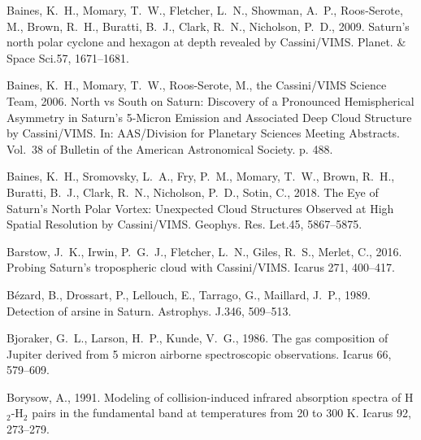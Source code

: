 \documentclass[article,11pt]{emulateapj}
\def\apj{Astrophys. J.}
\def\grl{Geophys. Res. Let.}
\def\planss{Planet. \& Space Sci.}
\begin{document}
\begin{thebibliography}{85}
{Baines}, K.~H., {Momary}, T.~W., {Fletcher}, L.~N., {Showman}, A.~P.,
  {Roos-Serote}, M., {Brown}, R.~H., {Buratti}, B.~J., {Clark}, R.~N.,
  {Nicholson}, P.~D., 2009{}. {Saturn's north polar cyclone and
  hexagon at depth revealed by Cassini/VIMS}. \planss 57, 1671--1681.

{Baines}, K.~H., {Momary}, T.~W., {Roos-Serote}, M., {the Cassini/VIMS Science
  Team}, 2006. {North vs South on Saturn: Discovery of a Pronounced
  Hemispherical Asymmetry in Saturn's 5-Micron Emission and Associated Deep
  Cloud Structure by Cassini/VIMS}. In: AAS/Division for Planetary Sciences
  Meeting Abstracts. Vol.~38 of Bulletin of the American Astronomical Society.
  p. 488.

{Baines}, K.~H., {Sromovsky}, L.~A., {Fry}, P.~M., {Momary}, T.~W., {Brown},
  R.~H., {Buratti}, B.~J., {Clark}, R.~N., {Nicholson}, P.~D., {Sotin}, C.,
  2018. {The Eye of Saturn's North Polar Vortex: Unexpected Cloud Structures
  Observed at High Spatial Resolution by Cassini/VIMS}. \grl 45, 5867--5875.

{Barstow}, J.~K., {Irwin}, P.~G.~J., {Fletcher}, L.~N., {Giles}, R.~S.,
  {Merlet}, C., 2016. {Probing Saturn's tropospheric cloud with Cassini/VIMS}.
  Icarus 271, 400--417.

{B\'ezard}, B., {Drossart}, P., {Lellouch}, E., {Tarrago}, G., {Maillard},
  J.~P., 1989. {Detection of arsine in Saturn}. \apj 346, 509--513.

{Bjoraker}, G.~L., {Larson}, H.~P., {Kunde}, V.~G., 1986. {The gas composition
  of Jupiter derived from 5 micron airborne spectroscopic observations}. Icarus
  66, 579--609.

{Borysow}, A., 1991. {Modeling of collision-induced infrared absorption spectra
  of H$_2$-H$_2$ pairs in the fundamental band at temperatures from 20 to 300
  K}. Icarus 92, 273--279.


\end{thebibliography}
\end{document}
